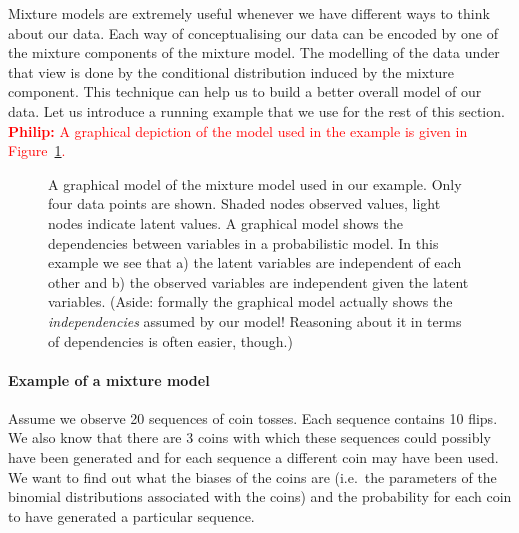 \documentclass[a4paper,11pt,leqno]{report}\usepackage[]{graphicx}\usepackage[]{color}
\newcommand{\philip}[1]{ \textcolor{red}{\textbf{Philip:} #1}}
\begin{document}
Mixture models are extremely useful whenever we have different ways to think about our data. Each way
of conceptualising our data can be encoded by one of the mixture components of the mixture model. The modelling
of the data under that view is done by the conditional distribution induced by the mixture component.
This technique can help us to build a better overall model of our data. Let us introduce a running example that
we use for the rest of this section. \philip{A graphical depiction of the model used in the example is given in Figure~\ref{fig:mixtureGraphical}.}
\begin{figure}
\center
{}
\caption{A graphical model of the mixture model used in our example. Only four data points are shown. Shaded nodes observed values, light nodes indicate
latent values. A graphical model shows the dependencies between variables in a probabilistic model. In this example we see that a) the latent variables
are independent of each other and b) the observed variables are independent given the latent variables. (Aside: formally the graphical model actually shows the
\textit{independencies} assumed by our model! Reasoning about it in terms of dependencies is often easier, though.)}
\label{fig:mixtureGraphical}
\end{figure}

\paragraph{Example of a mixture model} Assume we observe 20 sequences of coin tosses. Each sequence
contains 10 flips. We also know that there are 3 coins with which these sequences could possibly have been
generated and for each sequence a different coin may have been used. We want to find out what the biases
of the coins are (i.e.\ the parameters of the binomial distributions associated with the coins) and the probability
for each coin to have generated a particular sequence.
 
\end{document}
